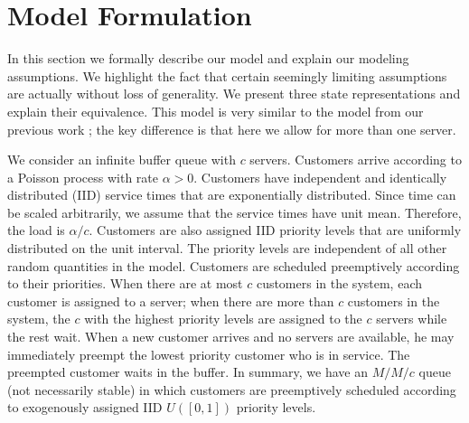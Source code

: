 \documentclass[conference]{IEEEtran}
\begin{document}
\section{Model Formulation\label{sec:model}}
In this section we formally describe our model and explain our
modeling assumptions. We highlight the fact that certain seemingly
limiting assumptions are actually without loss of generality. We
present three state representations and explain their
equivalence. This model is very similar to the model from our previous
work \cite{Master_ACC_2017}; the key difference is that here we allow
for more than one server.

We consider an infinite buffer queue with $c$ servers. Customers
arrive according to a Poisson process with rate $\alpha >
0$. Customers have independent and identically distributed (IID)
service times that are exponentially distributed. Since time can be
scaled arbitrarily, we assume that the service times have unit mean.
Therefore, the load is $\alpha / c$. Customers are also assigned IID
priority levels that are uniformly distributed on the unit
interval. The priority levels are independent of all other random
quantities in the model. Customers are scheduled preemptively
according to their priorities. When there are at most $c$ customers in
the system, each customer is assigned to a server; when there are more
than $c$ customers in the system, the $c$ with the highest priority
levels are assigned to the $c$ servers while the rest wait. When a new
customer arrives and no servers are available, he may immediately
preempt the lowest priority customer who is in service. The preempted
customer waits in the buffer.  In summary, we have an $M/M/c$ queue
(not necessarily stable) in which customers are preemptively scheduled
according to exogenously assigned IID $U([0, 1])$ priority levels.
\end{document}
